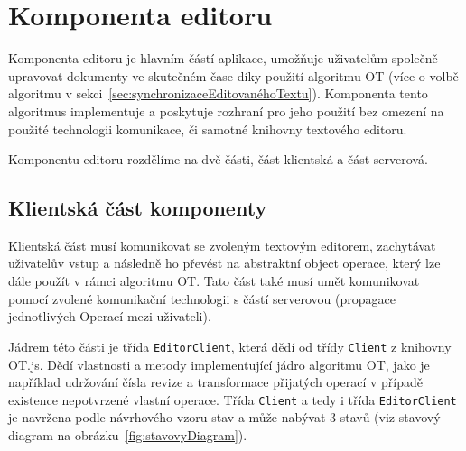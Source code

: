 
\section{Komponenta editoru}\label{sec:komponentaEditoru}

Komponenta editoru je hlavním částí aplikace, umožňuje uživatelům společně upravovat dokumenty ve skutečném čase díky použití algoritmu \gls{OT} (více o volbě algoritmu v sekci~\ref{sec:synchronizaceEditovanéhoTextu}).
Komponenta tento algoritmus implementuje a poskytuje rozhraní pro jeho použití bez omezení na použité technologii komunikace, či samotné knihovny textového editoru.

Komponentu editoru rozdělíme na dvě části, část klientská a část serverová.

\subsection{Klientská část komponenty}\label{subsec:klientskáČást}

Klientská část musí komunikovat se zvoleným textovým editorem, zachytávat uživatelův vstup a následně ho převést na abstraktní object operace, který lze dále použít v rámci algoritmu \gls{OT}.
Tato část také musí umět komunikovat pomocí zvolené komunikační technologii s částí serverovou (propagace jednotlivých Operací mezi uživateli).

Jádrem této části je třída \texttt{EditorClient}, která dědí od třídy \texttt{Client} z knihovny OT.js.
Dědí vlastnosti a metody implementující jádro algoritmu \gls{OT}, jako je například udržování čísla revize a transformace přijatých operací v případě existence nepotvrzené vlastní operace.
Třída \texttt{Client} a tedy i třída \texttt{EditorClient} je navržena podle návrhového vzoru stav a může nabývat 3 stavů (viz stavový diagram na obrázku~\ref{fig:stavovyDiagram}).

